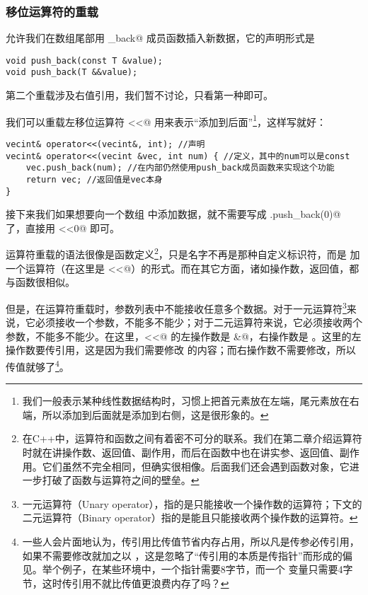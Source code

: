 \subsubsection*{移位运算符的重载}
\lstinline@vecint@ 允许我们在数组尾部用 \lstinline@push_back@ 成员函数插入新数据，它的声明形式是
\begin{lstlisting}
void push_back(const T &value);
void push_back(T &&value);
\end{lstlisting}
第二个重载涉及右值引用，我们暂不讨论，只看第一种即可。\par
我们可以重载左移位运算符 \lstinline@<<@ 用来表示``添加到后面''\footnote{我们一般表示某种线性数据结构时，习惯上把首元素放在左端，尾元素放在右端，所以添加到后面就是添加到右侧，这是很形象的。}，这样写就好：
\begin{lstlisting}
vecint& operator<<(vecint&, int); //声明
vecint& operator<<(vecint &vec, int num) { //定义，其中的num可以是const
    vec.push_back(num); //在内部仍然使用push_back成员函数来实现这个功能
    return vec; //返回值是vec本身
}
\end{lstlisting}
接下来我们如果想要向一个数组 \lstinline@arr@ 中添加数据，就不需要写成 \lstinline@arr.push_back(0)@ 了，直接用 \lstinline@arr<<0@ 即可。\par
运算符重载的语法很像是函数定义\footnote{在C++中，运算符和函数之间有着密不可分的联系。我们在第二章介绍运算符时就在讲操作数、返回值、副作用，而后在函数中也在讲实参、返回值、副作用。它们虽然不完全相同，但确实很相像。后面我们还会遇到函数对象，它进一步打破了函数与运算符之间的壁垒。}，只是名字不再是那种自定义标识符，而是 \lstinline@operator@ 加一个运算符（在这里是 \lstinline@<<@）的形式。而在其它方面，诸如操作数，返回值，都与函数很相似。\par
但是，在运算符重载时，参数列表中不能接收任意多个数据。对于一元运算符\footnote{一元运算符（Unary operator），指的是只能接收一个操作数的运算符；下文的二元运算符（Binary operator）指的是能且只能接收两个操作数的运算符。}来说，它必须接收一个参数，不能多不能少；对于二元运算符来说，它必须接收两个参数，不能多不能少。在这里，\lstinline@<<@ 的左操作数是 \lstinline@vecint&@，右操作数是 \lstinline@int@。这里的左操作数要传引用，这是因为我们需要修改 \lstinline@vec@ 的内容；而右操作数不需要修改，所以传值就够了\footnote{一些人会片面地认为，传引用比传值节省内存占用，所以凡是传参必传引用，如果不需要修改就加之以 \lstinline@const@，这是忽略了``传引用的本质是传指针''而形成的偏见。举个例子，在某些环境中，一个指针需要8字节，而一个 \lstinline@int@ 变量只需要4字节，这时传引用不就比传值更浪费内存了吗？}。\par
